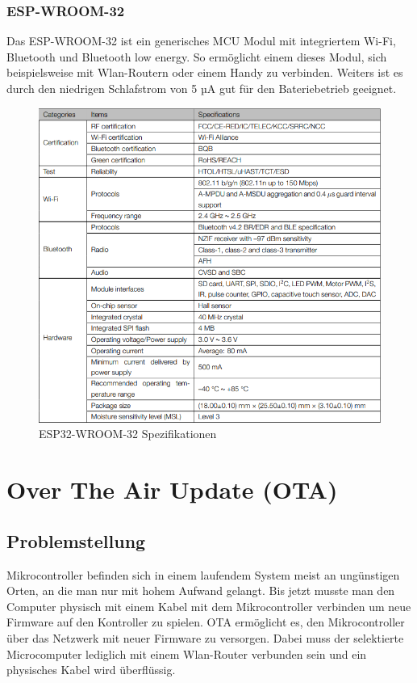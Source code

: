 \subsubsection{ESP-WROOM-32}\label{sec:esp-wroom-32}

Das ESP-WROOM-32 ist ein generisches MCU Modul mit integriertem Wi-Fi, Bluetooth und Bluetooth low energy. So ermöglicht einem dieses Modul, sich beispielsweise mit Wlan-Routern oder einem Handy zu verbinden. Weiters ist es durch den niedrigen Schlafstrom von 5 µA gut für den Bateriebetrieb geeignet.

\begin{figure}[H]
    \begin{center}
        \includegraphics[scale=0.78]{images/esp32-wroom-32.png}
        \caption{ESP32-WROOM-32 Spezifikationen\cite{esp32-wroom-32_secifications}}
    \end{center}
\end{figure}

\section{Over The Air Update (OTA)}\label{sec:ota}

\subsection*{Problemstellung}\label{sec:problem}
Mikrocontroller befinden sich in einem laufendem System meist an ungünstigen Orten, an die man nur mit hohem Aufwand gelangt.
Bis jetzt musste man den Computer physisch mit einem Kabel mit dem Mikrocontroller verbinden um neue Firmware auf den Kontroller zu spielen.
OTA ermöglicht es, den Mikrocontroller über das Netzwerk mit neuer Firmware zu versorgen. Dabei muss der selektierte Microcomputer lediglich mit einem Wlan-Router verbunden sein und ein physisches Kabel wird überflüssig.

